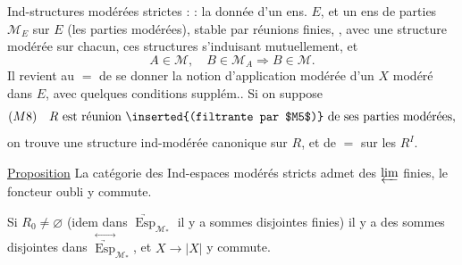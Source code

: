 Ind-structures modérées strictes   :  : la donnée d'un ens. $E$, et un ens de parties $\mathcal M_E$ sur $E$ (les parties modérées), stable par réunions finies, , avec une structure modérée sur chacun, ces structures s'induisant mutuellement, et
\[
 A\in\mathcal M,\quad B\in\mathcal M_A\Longrightarrow B\in\mathcal M.
\]
Il revient au $=$ de se donner la notion d'application modérée d'un $X$ modéré dans $E$, avec  quelques conditions supplém.. Si on suppose
\[
 (M8)\quad R\text{ est réunion \inserted{(filtrante par $M5$)} de ses parties modérées},
\]
on trouve une structure ind-modérée canonique sur $R$, et de $=$ sur les $R^I$.

\uline{Proposition} La catégorie des   Ind-espaces modérés stricts admet des $\varprojlim$ finies, le foncteur oubli y commute.

Si $R_0\ne\varnothing$ (idem dans $\underrightarrow{\operatorname{Esp}}_{\mathcal M_*}$ il y a sommes disjointes finies) il y a des sommes disjointes   dans $\overset{\leftrightarrow}{\underrightarrow{\operatorname{Esp}}}_{\mathcal M_*}$, et $X\longrightarrow |X|$ y commute.
